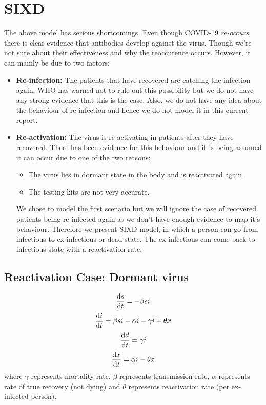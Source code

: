 \documentclass{article}
\begin{document}
	\section{SIXD}
	The above model has serious shortcomings. Even though COVID-19 \textit{re-occurs}, there is clear evidence that antibodies develop against the virus. Though we're not sure about their effectiveness and why the reoccurence occurs. However, it can mainly be due to two factors:
	\begin{itemize}
		\item \textbf{Re-infection:} The patients that have recovered are catching the infection again. WHO has warned not to rule out this possibility but we do not have any strong evidence that this is the case. Also, we do not have any idea about the behaviour of re-infection and hence we do not model it in this current report.
		\item \textbf{Re-activation:} The virus is re-activating in patients after they have recovered. There has been evidence for this behaviour and it is being assumed it can occur due to one of the two reasons:
		\begin{itemize}
		\item The virus lies in dormant state in the body and is reactivated again.
		\item The testing kits are not very accurate.
		\end{itemize}
		We chose to model the first scenario but we will ignore the case of recovered patients being re-infected again as we don't have enough evidence to map it's behaviour. Therefore we present SIXD model, in which a person can go from infectious to ex-infectious or dead state. The ex-infectious can come back to infectious state with a reactivation rate.
	\end{itemize}

	\subsection{Reactivation Case: Dormant virus}
	\begin{equation*}
		\dv{s}{t} = -\beta si
	\end{equation*}
	\begin{equation*}
		\dv{i}{t} = \beta si - \alpha i - \gamma i + \theta x
	\end{equation*}
	\begin{equation*}
		\dv{d}{t} = \gamma i
	\end{equation*}
	\begin{equation*}
		\dv{x}{t} = \alpha i -\theta x
	\end{equation*}
	where $\gamma$ represents mortality rate, $\beta$ represents transmission rate, $\alpha$ represents rate of true recovery (not dying) and $\theta$ represents reactivation rate (per ex-infected person).
	\newpage
\end{document}
